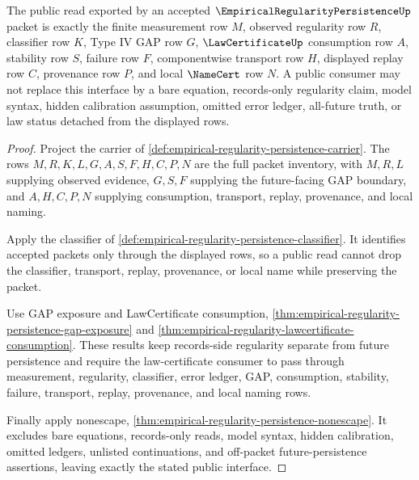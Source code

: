 \begin{theorem}
\label{thm:empirical-regularity-public-interface}
The public read exported by an accepted $\EmpiricalRegularityPersistenceUp$ packet is exactly the finite measurement row $M$, observed regularity row $R$, classifier row $K$, Type IV GAP row $G$, $\LawCertificateUp$ consumption row $A$, stability row $S$, failure row $F$, componentwise transport row $H$, displayed replay row $C$, provenance row $P$, and local $\NameCert$ row $N$. A public consumer may not replace this interface by a bare equation, records-only regularity claim, model syntax, hidden calibration assumption, omitted error ledger, all-future truth, or law status detached from the displayed rows.
\end{theorem}
\begin{proof}
Project the carrier of \autoref{def:empirical-regularity-persistence-carrier}. The rows $M,R,K,L,G,A,S,F,H,C,P,N$ are the full packet inventory, with $M,R,L$ supplying observed evidence, $G,S,F$ supplying the future-facing GAP boundary, and $A,H,C,P,N$ supplying consumption, transport, replay, provenance, and local naming.

Apply the classifier of \autoref{def:empirical-regularity-persistence-classifier}. It identifies accepted packets only through the displayed rows, so a public read cannot drop the classifier, transport, replay, provenance, or local name while preserving the packet.

Use GAP exposure and LawCertificate consumption, \autoref{thm:empirical-regularity-persistence-gap-exposure} and \autoref{thm:empirical-regularity-lawcertificate-consumption}. These results keep records-side regularity separate from future persistence and require the law-certificate consumer to pass through measurement, regularity, classifier, error ledger, GAP, consumption, stability, failure, transport, replay, provenance, and local naming rows.

Finally apply nonescape, \autoref{thm:empirical-regularity-persistence-nonescape}. It excludes bare equations, records-only reads, model syntax, hidden calibration, omitted ledgers, unlisted continuations, and off-packet future-persistence assertions, leaving exactly the stated public interface.
\end{proof}

